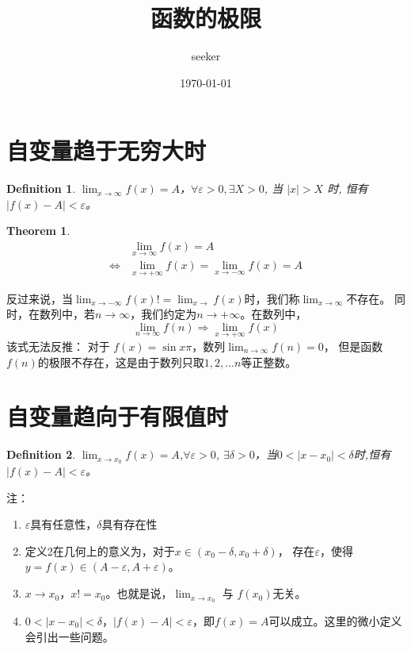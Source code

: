 \documentclass[UTF8]{ctexart}
\title{函数的极限}
\author{seeker}
\date{\today}
\newtheorem{definition}{Definition}
\newtheorem{theorem}{Theorem}
\begin{document}
	\maketitle
	\section{自变量趋于无穷大时}
	\begin{definition}
		$\lim _{x \rightarrow \infty} f(x)=A$，$\forall \varepsilon>0, \exists X>0$, 当 $|x|>X$ 时, 恒有 $|f(x)-A|<\varepsilon$。
	\end{definition}
	
	\begin{theorem}
		\begin{equation}
			\begin{split}
				&\lim _{x\rightarrow \infty}f(x)=A \\
				\Leftrightarrow 
				&\lim _{x\rightarrow + \infty}f(x)
				=\lim _{x\rightarrow - \infty}f(x)=A
			\end{split}
		\end{equation}
	\end{theorem}


	反过来说，当$\lim _{x \rightarrow -\infty}f(x)!=\lim _{x \rightarrow}f(x)$时，我们称$\lim_{x \rightarrow \infty}$不存在。
	同时，在数列中，若$n\rightarrow \infty$，我们约定为$n\rightarrow +\infty$。在数列中，
	$$\lim _{n\rightarrow \infty}f(n) \Rightarrow \lim _{x\rightarrow +\infty}f(x)$$
	该式无法反推：
	对于 $f(x)=\sin{x\pi}$，数列$\lim _{n\rightarrow\infty}f(n)=0$，
	但是函数$f(n)$的极限不存在，这是由于数列只取$1,2,...n$等正整数。
	
	\section{自变量趋向于有限值时}
	\begin{definition}
		$\lim _{x\rightarrow x_0}f(x)=A$,$\forall \varepsilon > 0$,
		$\exists \delta > 0$，当$0<|x-x_0|<\delta$时,恒有$|f(x)-A|<\varepsilon$。
	\end{definition}
	
	注：
	\begin{enumerate}
		\item $\varepsilon$具有任意性，$\delta$具有存在性
		\item 定义2在几何上的意义为，对于$x \in (x_0-\delta,x_0+\delta)$，
		存在$\varepsilon$，使得$y=f(x)\in (A-\varepsilon,A+\varepsilon)$。
		\item $x\rightarrow x_0$，$x!=x_0$。也就是说，$\lim _{x\rightarrow x_0}$ 与 $f(x_0)$无关。
		\item $0<|x-x_0|<\delta$，$|f(x)-A|<\varepsilon$，即$f(x)=A$可以成立。这里的微小定义会引出一些问题。
		
	\end{enumerate}
\end{document}
